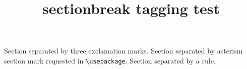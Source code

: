\documentclass{article}
\title{sectionbreak tagging test}
\begin{document}
Section separated by three exclamation marks.
\sectionbreak[!!!]
Section separated by asterism section mark requested in \texttt{\textbackslash usepackage}.
\sectionbreak
Section separated by a rule.
\sectionbreakmark{\rule{10em}{3pt}}
\sectionbreak
\end{document}
